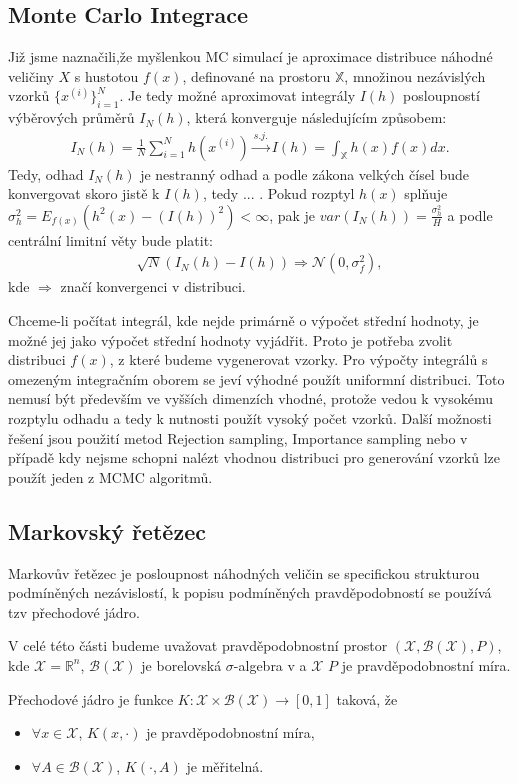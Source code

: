 \documentclass[czech,master,public,dept470,male,cpdeclaration,oneside, python]{diploma}
\begin{document}
\subsection{Monte Carlo Integrace}
Již jsme naznačili,že  myšlenkou MC simulací je aproximace distribuce náhodné veličiny $X$ s hustotou $f(x)$, definované na prostoru $\mathbb{X}$, množinou nezávislých vzorků $\{x^{(i)}\}_{i=1}^{N}$. Je tedy možné aproximovat integrály $I(h)$ posloupností výběrových průměrů $I_N(h)$, která konverguje následujícím způsobem:
\begin{align}
	I_N(h) = \frac{1}{N}\sum_{i=1}^N h(x^{(i)}) \xrightarrow{s.j.} I(h) = \int_{\mathbb{X}} h(x)f(x)dx.
\end{align}
Tedy, odhad $I_N(h)$ je nestranný odhad a podle zákona velkých čísel bude konvergovat skoro jistě k $I(h)$, tedy ... . Pokud rozptyl $h(x)$ splňuje $\sigma^2_h = E_{f(x)}(h^2(x) - (I(h))^2) < \infty$, pak je $var(I_N(h)) = \frac{\sigma^2_h}{H}$ a podle centrální limitní věty bude platit:
\begin{align}
	\sqrt{N}(I_N(h) - I(h)) \Rightarrow \mathcal{N}(0, \sigma^2_f),
\end{align}
kde $\Rightarrow$ značí konvergenci v distribuci.
\par

Chceme-li počítat integrál, kde nejde primárně o výpočet střední hodnoty, je možné jej jako výpočet střední hodnoty vyjádřit. Proto je potřeba zvolit distribuci $f(x)$, z které budeme vygenerovat vzorky. Pro výpočty integrálů s omezeným integračním oborem se jeví výhodné použít uniformní distribuci. Toto nemusí být především ve vyšších dimenzích vhodné, protože vedou k vysokému rozptylu odhadu a tedy k nutnosti použít vysoký počet vzorků. Další možnosti řešení jsou použití metod Rejection sampling, Importance sampling \cite{andrieu2003introduction} nebo v případě kdy nejsme schopni nalézt vhodnou distribuci pro generování vzorků lze použít jeden z MCMC algoritmů. \par
\subsection{Markovský řetězec}
Markovův řetězec je posloupnost náhodných veličin se specifickou strukturou podmíněných nezávislostí, k popisu podmíněných pravděpodobností se používá tzv přechodové jádro. \par
V celé této části budeme uvažovat pravděpodobnostní prostor $(\mathcal{X}, \mathcal{B}(\mathcal{X}), P)$, kde $\mathcal{X} = \mathbb{R}^n$, $\mathcal{B}(\mathcal{X})$ je borelovská $\sigma$-algebra v a $\mathcal{X}$ $P$ je pravděpodobnostní míra.
\begin{definition}
	Přechodové jádro je funkce $K: \mathcal{X} \times \mathcal{B}(\mathcal{X}) \rightarrow [0, 1]$ taková, že 
	\begin{itemize}
	\item $\forall x \in \mathcal{X}$, $K(x, \cdot)$ je pravděpodobnostní míra,
	\item $\forall A \in \mathcal{B}(\mathcal{X})$, $K(\cdot, A)$ je měřitelná.
	\end{itemize}
\end{definition}
\end{document}

